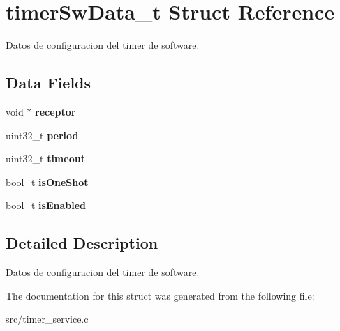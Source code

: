 \hypertarget{structtimerSwData__t}{}\section{timer\+Sw\+Data\+\_\+t Struct Reference}
\label{structtimerSwData__t}


Datos de configuracion del timer de software.  


\subsection*{Data Fields}
\begin{DoxyCompactItemize}
\item 
void $\ast$ {\bfseries receptor}\hypertarget{structtimerSwData__t_a8d856e5b5c1b513bef465196550a440f}{}\label{structtimerSwData__t_a8d856e5b5c1b513bef465196550a440f}

\item 
uint32\+\_\+t {\bfseries period}\hypertarget{structtimerSwData__t_a6597daaf33c96ef4edaa2a45ad6f3029}{}\label{structtimerSwData__t_a6597daaf33c96ef4edaa2a45ad6f3029}

\item 
uint32\+\_\+t {\bfseries timeout}\hypertarget{structtimerSwData__t_aad4253b396dadd9388668b82f8d75a34}{}\label{structtimerSwData__t_aad4253b396dadd9388668b82f8d75a34}

\item 
bool\+\_\+t {\bfseries is\+One\+Shot}\hypertarget{structtimerSwData__t_a8d9830eefdc89a7c45a9d70df7b7ebc8}{}\label{structtimerSwData__t_a8d9830eefdc89a7c45a9d70df7b7ebc8}

\item 
bool\+\_\+t {\bfseries is\+Enabled}\hypertarget{structtimerSwData__t_a29747facdb13a882cd448d7e72d4a51d}{}\label{structtimerSwData__t_a29747facdb13a882cd448d7e72d4a51d}

\end{DoxyCompactItemize}


\subsection{Detailed Description}
Datos de configuracion del timer de software. 

The documentation for this struct was generated from the following file\+:\begin{DoxyCompactItemize}
\item 
src/timer\+\_\+service.\+c\end{DoxyCompactItemize}
